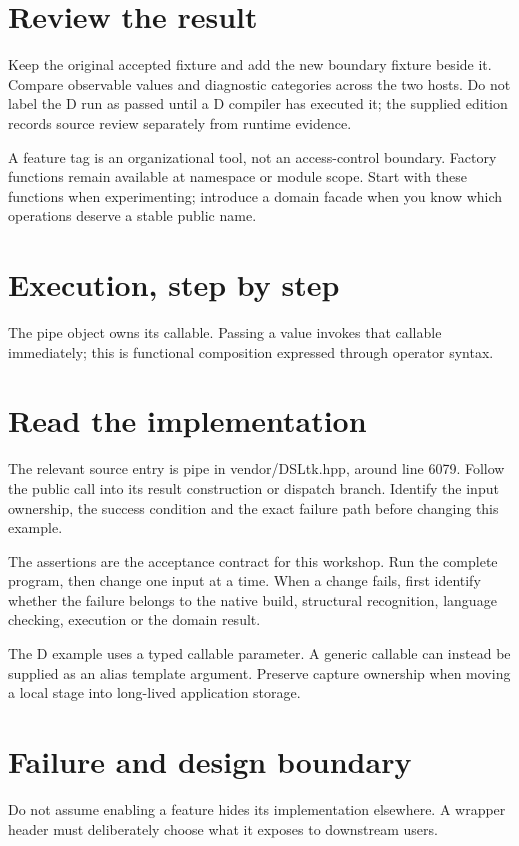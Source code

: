 \section*{Review the result}
Keep the original accepted fixture and add the new boundary fixture beside it. Compare observable values and diagnostic categories across the two hosts. Do not label the D run as passed until a D compiler has executed it; the supplied edition records source review separately from runtime evidence.

\clearpage
{}
A feature tag is an organizational tool, not an access-control boundary. Factory functions remain available at namespace or module scope. Start with these functions when experimenting; introduce a domain facade when you know which operations deserve a stable public name.


\section*{Execution, step by step}
The pipe object owns its callable. Passing a value invokes that callable immediately; this is functional composition expressed through operator syntax.

\section*{Read the implementation}
The relevant source entry is pipe in vendor/DSLtk.hpp, around line 6079. Follow the public call into its result construction or dispatch branch. Identify the input ownership, the success condition and the exact failure path before changing this example.

The assertions are the acceptance contract for this workshop. Run the complete program, then change one input at a time. When a change fails, first identify whether the failure belongs to the native build, structural recognition, language checking, execution or the domain result.

\clearpage
{}
The D example uses a typed callable parameter. A generic callable can instead be supplied as an alias template argument. Preserve capture ownership when moving a local stage into long-lived application storage.


\section*{Failure and design boundary}
Do not assume enabling a feature hides its implementation elsewhere. A wrapper header must deliberately choose what it exposes to downstream users.

